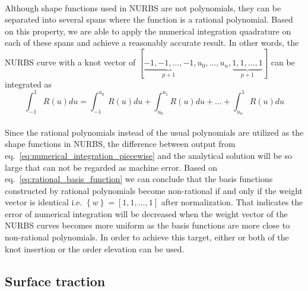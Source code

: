 \paragraph{}
Although shape functions used in NURBS are not polynomials, they can be separated into several spans where the function is a 
    rational polynomial. 
Based on this property, we are able to apply the numerical integration quadrature on each of these spans and achieve a reasonably 
    accurate result.
In other words, the NURBS curve with a knot vector of 
$[ 
    \underbrace{-1,-1,\dots,-1}_{p+1}, 
    u_0,\dots,u_n, 
    \underbrace{1,1,\dots,1 }_{p+1}
]$
can be integrated as
\begin{equation}
    \int_{-1}^{1} R(u) du = \int_{-1}^{u_0} R(u)du + 
                            \int_{u_0}^{u_1} R(u)du + \dots +
                            \int_{u_n}^1 R(u)du
\label{eq:numerical_integration_piecewise}
\end{equation}

\paragraph{}
Since the rational polynomials instead of the usual polynomials are utilized as the shape functions in NURBS, the difference between
    output from eq.~\ref{eq:numerical_integration_piecewise} and the analytical solution will be so large that can not be regarded as
    machine error.
Based on eq.~\ref{eq:rational_basis_function} we can conclude that the basis functions constructed by rational polynomials become
    non-rational if and only if the weight vector is identical i.e. $\left\{ w \right\} = \left[ 1,1,\dots,1 \right]$ after normalization.
That indicates the error of numerical integration will be decreased when the weight vector of the NURBS curves becomes more uniform as
    the basis functions are more close to non-rational polynomials.
In order to achieve this target, either or both of the knot insertion or the order elevation can be used.
\pagebreak

\subsection{Surface traction}
\label{subsection:surface_traction}
